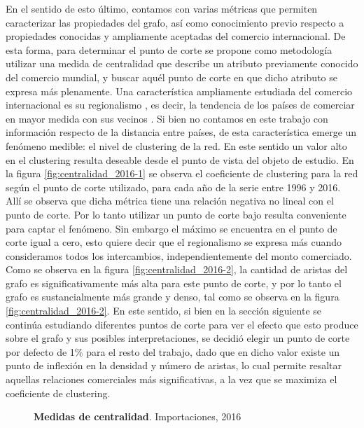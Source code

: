 \documentclass[class=article, crop=false]{standalone}
\begin{document}
En el sentido de esto último, contamos con varias métricas que permiten caracterizar las propiedades del grafo, así como conocimiento previo respecto a propiedades conocidas y ampliamente aceptadas del comercio internacional. De esta forma, para determinar el punto de corte se propone como metodología utilizar una medida de centralidad que describe un atributo previamente conocido del comercio mundial, y buscar aquél punto de corte en que dicho atributo se expresa más plenamente. Una característica ampliamente estudiada del comercio internacional es su regionalismo \citep{das2004regionalism}, es decir, la tendencia de los países de comerciar en mayor medida con sus vecinos \citep{Head2014}. Si bien no contamos en este trabajo con información respecto de la distancia entre países, de esta característica emerge un fenómeno medible: el nivel de clustering de la red. En este sentido un valor alto en el clustering resulta deseable desde el punto de vista del objeto de estudio. En la figura \ref{fig:centralidad_2016-1} se observa el coeficiente de clustering para la red según el punto de corte utilizado, para cada año de la serie entre 1996 y 2016. Allí se observa que dicha métrica tiene una relación negativa no lineal con el punto de corte. Por lo tanto utilizar un punto de corte bajo resulta conveniente para captar el fenómeno. Sin embargo el máximo se encuentra en el punto de corte igual a cero, esto quiere decir que el regionalismo se expresa más cuando consideramos todos los intercambios, independientemente del monto comerciado. Como se observa en la figura \ref{fig:centralidad_2016-2}, la cantidad de aristas del grafo es significativamente más alta para este punto de corte, y por lo tanto el grafo es sustancialmente más grande y denso, tal como se observa en la figura \ref{fig:centralidad_2016-2}. En este sentido, si bien en la sección siguiente se continúa estudiando diferentes puntos de corte para ver el efecto que esto produce sobre el grafo y sus posibles interpretaciones, se decidió elegir un punto de corte por defecto de 1\% para el resto del trabajo, dado que en dicho valor existe un punto de inflexión en la densidad y número de aristas, lo cual permite resaltar aquellas relaciones comerciales más significativas, a la vez que se maximiza el coeficiente de clustering.

\begin{figure}
\centering
{}

\caption{\textbf{Medidas de centralidad}. Importaciones, 2016}
\label{fig:centralidad_2016}
\end{figure}
\end{document}
